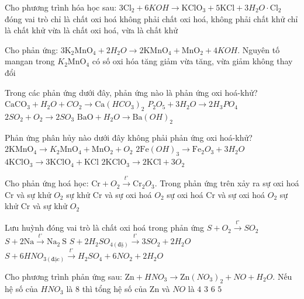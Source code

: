 \begin{ex}
	Cho phương trình hóa học sau: $3 \mathrm{Cl}_2+6 KOH \to \mathrm{KClO}_3+5 \mathrm{KCl}+3 H_2O \cdot \mathrm{Cl}_2$ đóng vai trò
	\choice
	{chỉ là chất oxi hoá}
	{không phải chất oxi hoá, không phải chất khử}
	{chỉ là chất khử}
	{vừa là chất oxi hoá, vừa là chất khử}
	\loigiai{}
\end{ex}
\begin{ex}
	Cho phản ứng: $3\mathrm{K}_2 \mathrm{MnO}_4+2 H_2O \to 2 \mathrm{KMnO}_4+\mathrm{MnO}_2+4 KOH$. Nguyên tố mangan trong $K_2\mathrm{MnO}_4$ có số oxi hóa
	\choice
	{tăng}
	{giảm}
	{vừa tăng, vừa giảm}
	{không thay đổi}
	\loigiai{}
\end{ex}
\begin{ex}
	Trong các phản ứng dưới đây, phản ứng nào là phản ứng oxi hoá-khử?
	\choice
	{$\mathrm{CaCO}_3+H_2O+CO_2 \to \mathrm{Ca}\left(HCO_3\right)_2$}
	{$P_2 O_5+3 H_2O \to 2 H_3 PO_4$}
	{$2SO_2+O_2\to 2SO_3$}
	{$\mathrm{BaO}+H_2O \to \mathrm{Ba}(OH)_2$}
	\loigiai{}
\end{ex}
\begin{ex}
	Phản ứng phân hủy nào dưới đây không phải phản ứng oxi hoá-khử?
	\choice
	{$2 \mathrm{KMnO}_4 \to K_2\mathrm{MnO}_4+\mathrm{MnO}_2+O_2$}
	{$2 \mathrm{Fe}(OH)_3 \to \mathrm{Fe}_2 O_3+3 H_2O$}
	{$4\mathrm{KClO}_3\to 3\mathrm{KClO}_4+\mathrm{KCl}$}
	{$2\mathrm{KClO}_3\to 2\mathrm{KCl}+3O_2$}
	\loigiai{}
\end{ex}
\begin{ex}
	Cho phản ứng hoá học: $\mathrm{Cr}+O_2\xrightarrow{t^{\circ}} \mathrm{Cr}_2O_3$. Trong phản ứng trên xảy ra
	\choice
	{sự oxi hoá $\mathrm{Cr}$ và sự khử $O_2$}
	{sự khử Cr và sự oxi hoá $O_2$}
	{sự oxi hoá $\mathrm{Cr}$ và sự oxi hoá $O_2$}
	{sự khử $\mathrm{Cr}$ và sự khử $O_2$}
	\loigiai{}
\end{ex}
\begin{ex}
	Lưu huỳnh đóng vai trò là chất oxi hoá trong phản ứng
	\choice
	{$S+O_2\xrightarrow{t^{\circ}} SO_2$}
	{$S+2\mathrm{Na} \xrightarrow{t^{\circ}} \mathrm{Na}_2\mathrm{~S}$}
	{$S+2 H_2 SO_{4(\text {đặ})} \xrightarrow{t^{\circ}} 3 SO_2+2 H_2O$}
	{$S+6 HNO_{3(\text {đặc})} \xrightarrow{t^{\circ}} H_2 SO_4+6 NO_2+2 H_2O$}
	\loigiai{}
\end{ex}
\begin{ex}
	Cho phương trình phản ứng sau: $\mathrm{Zn}+HNO_3 \to \mathrm{Zn}\left(NO_3\right)_2+NO+H_2O$. Nếu hệ số của $HNO_3$ là 8 thì tổng hệ số của $\mathrm{Zn}$ và $NO$ là
	\choice
	{$4$}
	{$3$}
	{$6$}
	{$5$}
	\loigiai{}
\end{ex}
